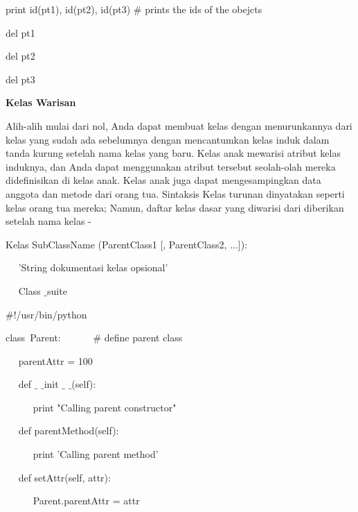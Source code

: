 \begin {enumerate}
print id(pt1), id(pt2), id(pt3)  $  \#  $ prints the ids of the obejcts \par
\noindent 
del pt1 \par
\noindent 
del pt2 \par
\noindent 
del pt3 \par
\vspace{12pt}
\vspace{12pt}
\noindent 
{\fontsize{14pt}{14pt}\selectfont \textbf{Kelas Warisan} \\} \par
\vspace{12pt}
Alih-alih mulai dari nol, Anda dapat membuat kelas dengan menurunkannya dari kelas yang sudah ada sebelumnya dengan mencantumkan kelas induk dalam tanda kurung setelah nama kelas yang baru. Kelas anak mewarisi atribut kelas induknya, dan Anda dapat menggunakan atribut tersebut seolah-olah mereka didefinisikan di kelas anak. Kelas anak juga dapat mengesampingkan data anggota dan metode dari orang tua. Sintaksis Kelas turunan dinyatakan seperti kelas orang tua mereka; Namun, daftar kelas dasar yang diwarisi dari diberikan setelah nama kelas - \par
\vspace{12pt}
\noindent 
Kelas SubClassName (ParentClass1 [, ParentClass2, ...]): \par
\noindent 
~~ 'String dokumentasi kelas opsional' \par
\noindent 
~~ Class $  \_  $suite \par
\noindent 
 $  \#  $!/usr/bin/python \par
\vspace{12pt}
\noindent 
class~Parent:~~~~~~   $  \#  $ define parent class \par
\noindent 
~~ parentAttr = 100 \par
\noindent 
~~ def  $  \_  $ $  \_  $init $  \_  $ $  \_  $(self): \par
\noindent 
~~~~~ print "Calling parent constructor" \par
\vspace{12pt}
\noindent 
~~ def parentMethod(self): \par
\noindent 
~~~~~ print 'Calling parent method' \par
\vspace{12pt}
\noindent 
~~ def setAttr(self, attr): \par
\noindent 
~~~~~ Parent.parentAttr = attr \par
\vspace{12pt}
\noindent 

\end{enumerate}

